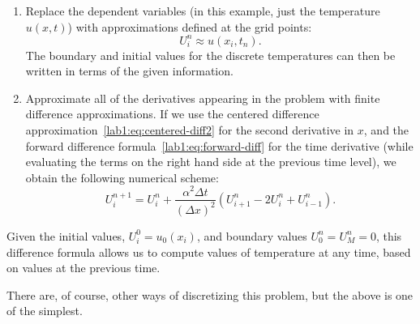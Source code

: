 \begin{example}
\begin{enumerate}
  \item Replace the dependent variables (in this example, just the
    temperature $u(x,t)$) with approximations defined at the grid
    points:
    \[ 
    U_i^n \approx u(x_i,t_n).
    \]
    The boundary and initial values for the discrete temperatures can then
    be written in terms of the given information.
    
  \item Approximate all of the derivatives appearing in the problem with
    finite difference approximations.  
    If we use the centered difference
    approximation~\eqref{lab1:eq:centered-diff2} for the second
    derivative in $x$, and the forward difference
    formula~\eqref{lab1:eq:forward-diff} for the time derivative
    (while evaluating the terms on the right hand side at the previous
    time level), we obtain the following numerical scheme:
    \[
    U_i^{n+1} = U_i^n + \frac{\alpha^2 \Delta t}{(\Delta x)^2} \left(
      U_{i+1}^n - 2 U_i^n + U_{i-1}^n \right).
    \]
  \end{enumerate}
  Given the initial values, $U_i^0=u_0(x_i)$,
  and boundary values $U_0^n=U_M^n=0$, this difference formula allows
  us to compute values of temperature at any time, based on
  values at the previous time.

  There are, of course, other ways of discretizing this problem, but
  the above is one of the simplest.  
\end{example}


